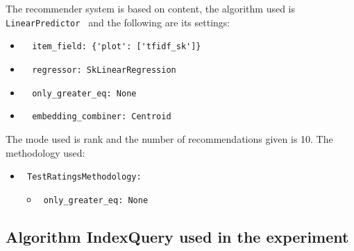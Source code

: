 \documentclass[11pt]{article}
\begin{document}
The recommender system is based on content, the algorithm used
is \verb| LinearPredictor | and the following are its settings:
\begin{itemize}
\item \begin{verbatim}
  item_field: {'plot': ['tfidf_sk']}
\end{verbatim}
\item \begin{verbatim}
  regressor: SkLinearRegression
\end{verbatim}
\item \begin{verbatim}
  only_greater_eq: None
\end{verbatim}
\item \begin{verbatim}
  embedding_combiner: Centroid
\end{verbatim}
\end{itemize}
\hfill\break
The mode used is rank and the number of recommendations given
is 10.
The methodology used:
\begin{itemize}
    \item \verb| TestRatingsMethodology:|
    \begin{itemize}
                    \item \verb| only_greater_eq: None |
            \end{itemize}
\end{itemize}
\hfill\break






\subsection{Algorithm IndexQuery used in the experiment}\label{subsec:algo_IndexQuery}
\end{document}
